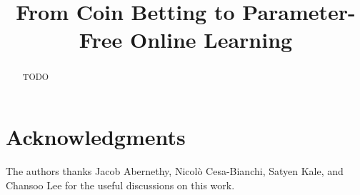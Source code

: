 \documentclass[anon,12pt]{colt2016} %
\title{From Coin Betting to Parameter-Free Online Learning}
\begin{document}
\maketitle

\begin{abstract}
TODO
\end{abstract}


\section*{Acknowledgments}
The authors thanks  Jacob Abernethy, Nicol\`{o} Cesa-Bianchi, Satyen Kale, and
Chansoo Lee for the useful discussions on this work.


\end{document}
